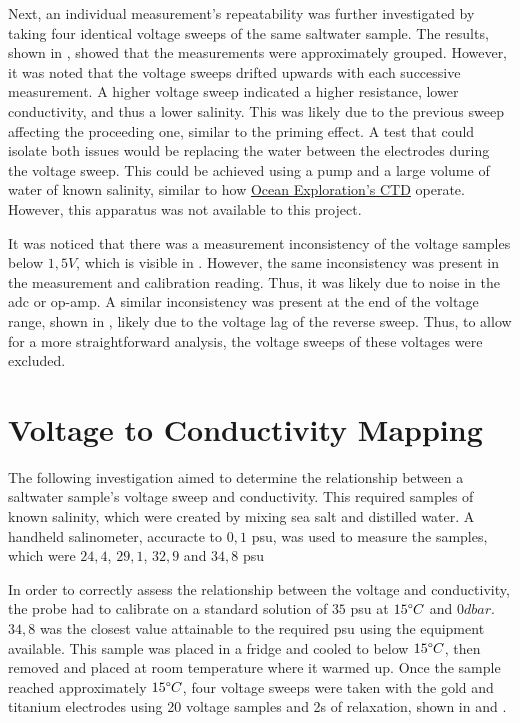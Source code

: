 Next, an individual measurement's repeatability was further investigated by taking four identical voltage sweeps of the same saltwater sample.
The results, shown in , showed that the measurements were approximately grouped.
However, it was noted that the voltage sweeps drifted upwards with each successive measurement.
A higher voltage sweep indicated a higher resistance, lower conductivity, and thus a lower salinity.
This was likely due to the previous sweep affecting the proceeding one, similar to the priming effect.
A test that could isolate both issues would be replacing the water between the electrodes during the voltage sweep.
This could be achieved using a pump and a large volume of water of known salinity, similar to how \href{https://oceanexplorer.noaa.gov/technology/ctd/ctd.html}{Ocean Exploration's CTD} operate. 
However, this apparatus was not available to this project.

It was noticed that there was a measurement inconsistency of the voltage samples below $1,5V$, which is visible in .
However, the same inconsistency was present in the measurement and calibration reading. 
Thus, it was likely due to noise in the \gls{adc} or op-amp.
A similar inconsistency was present at the end of the voltage range, shown in , likely due to the voltage lag of the reverse sweep.
Thus, to allow for a more straightforward analysis, the voltage sweeps of these voltages were excluded.

\section{Voltage to Conductivity Mapping}\label{sec:voltage-conductivity-mapping}

The following investigation aimed to determine the relationship between a saltwater sample's voltage sweep and conductivity.
This required samples of known salinity, which were created by mixing sea salt and distilled water.
A handheld salinometer, accuracte to $0,1$ \gls{psu}, was used to measure the samples, which were $24,4$, $29,1$, $32,9$ and $34,8$ \gls{psu}

In order to correctly assess the relationship between the voltage and conductivity, the probe had to calibrate on a standard solution of $35$ \gls{psu} at $15\degree C$ and $0dbar$.
$34,8$ was the closest value attainable to the required \gls{psu} using the equipment available.
This sample was placed in a fridge and cooled to below $15\degree C$, then removed and placed at room temperature where it warmed up. 
Once the sample reached approximately $15\degree C$, four voltage sweeps were taken with the gold and titanium electrodes using 20 voltage samples and 2s of relaxation, shown in  and .

